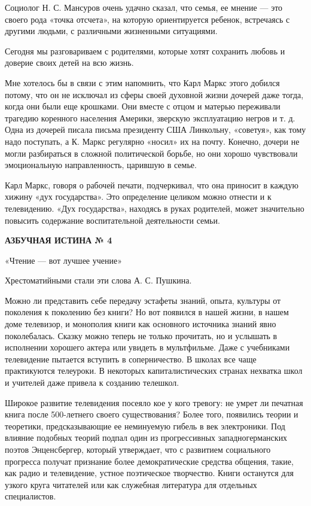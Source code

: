 \documentclass[12pt, a4paper, openany]{book}
\begin{document}
Социолог Н. С. Мансуров очень удачно сказал, что семья, ее мнение — это своего рода «точка отсчета», на которую ориентируется ребенок, встречаясь с другими людьми, с различными жизненными ситуациями. 

Сегодня мы разговариваем с родителями, которые хотят сохранить любовь и доверие своих детей на всю жизнь. 

Мне хотелось бы в связи с этим напомнить, что Карл Маркс этого добился потому, что он не исключал из сферы своей духовной жизни дочерей даже тогда, когда они были еще крошками. Они вместе с отцом и матерью переживали трагедию коренного населения Америки, зверскую эксплуатацию негров и т. д. Одна из дочерей писала письма президенту США Линкольну, «советуя», как тому надо поступать, а К. Маркс регулярно «носил» их на почту. Конечно, дочери не могли разбираться в сложной политической борьбе, но они хорошо чувствовали эмоциональную направленность, царившую в семье. 

Карл Маркс, говоря о рабочей печати, подчеркивал, что она приносит в каждую хижину «дух государства». Это определение целиком можно отнести и к телевидению. «Дух государства», находясь в руках родителей, может значительно повысить содержание воспитательной деятельности семьи. 

\begin{center}
	\textbf{АЗБУЧНАЯ ИСТИНА № 4 }

«Чтение — вот лучшее учение» 
\end{center}

Хрестоматийными стали эти слова А. С. Пушкина. 

Можно ли представить себе передачу эстафеты знаний, опыта, культуры от поколения к поколению без книги? Но вот появился в нашей жизни, в нашем доме телевизор, и монополия книги как основного источника знаний явно поколебалась. Сказку можно теперь не только прочитать, но и услышать в исполнении хорошего актера или увидеть в мультфильме. Даже с учебниками телевидение пытается вступить в соперничество. В школах все чаще практикуются телеуроки. В некоторых капиталистических странах нехватка школ и учителей даже привела к созданию телешкол. 

Широкое развитие телевидения посеяло кое у кого тревогу: не умрет ли печатная книга после 500-летнего своего существования? Более того, появились теории и теоретики, предсказывающие ее неминуемую гибель в век электроники. Под влияние подобных теорий подпал один из прогрессивных западногерманских поэтов Энценсбергер, который утверждает, что с развитием социального прогресса получат признание более демократические средства общения, такие, как радио и телевидение, устное поэтическое творчество. Книги останутся для узкого круга читателей или как служебная литература для отдельных специалистов. 
\end{document}
